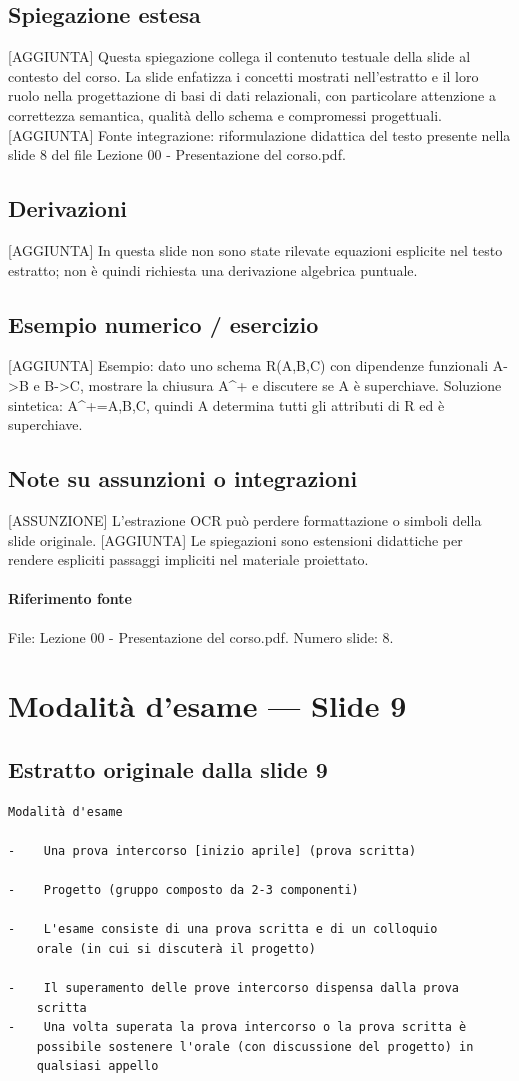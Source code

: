 \documentclass[11pt]{article}
\begin{document}
\subsection*{Spiegazione estesa}
[AGGIUNTA] Questa spiegazione collega il contenuto testuale della slide al contesto del corso. La slide enfatizza i concetti mostrati nell'estratto e il loro ruolo nella progettazione di basi di dati relazionali, con particolare attenzione a correttezza semantica, qualità dello schema e compromessi progettuali.
[AGGIUNTA] Fonte integrazione: riformulazione didattica del testo presente nella slide 8 del file Lezione 00 - Presentazione del corso.pdf.
\subsection*{Derivazioni}
[AGGIUNTA] In questa slide non sono state rilevate equazioni esplicite nel testo estratto; non è quindi richiesta una derivazione algebrica puntuale.
\subsection*{Esempio numerico / esercizio}
[AGGIUNTA] Esempio: dato uno schema R(A,B,C) con dipendenze funzionali A->B e B->C, mostrare la chiusura A^+ e discutere se A è superchiave. Soluzione sintetica: A^+={A,B,C}, quindi A determina tutti gli attributi di R ed è superchiave.
\subsection*{Note su assunzioni o integrazioni}
[ASSUNZIONE] L'estrazione OCR può perdere formattazione o simboli della slide originale.
[AGGIUNTA] Le spiegazioni sono estensioni didattiche per rendere espliciti passaggi impliciti nel materiale proiettato.
\paragraph{Riferimento fonte} File: Lezione 00 - Presentazione del corso.pdf. Numero slide: 8.
\section{Modalità d'esame --- Slide 9}
\subsection*{Estratto originale dalla slide 9}
\begin{lstlisting}
Modalità d'esame

-    Una prova intercorso [inizio aprile] (prova scritta)

-    Progetto (gruppo composto da 2-3 componenti)

-    L'esame consiste di una prova scritta e di un colloquio
    orale (in cui si discuterà il progetto)

-    Il superamento delle prove intercorso dispensa dalla prova
    scritta
-    Una volta superata la prova intercorso o la prova scritta è
    possibile sostenere l'orale (con discussione del progetto) in
    qualsiasi appello
\end{lstlisting}
\end{document}
